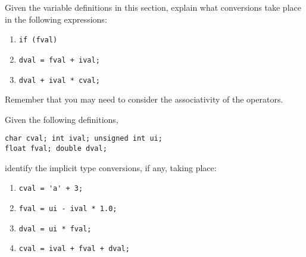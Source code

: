 %
%
\begin{question}
Given the variable definitions in this section, explain what
conversions take place in the following expressions:
\begin{enumerate}[label=(\alph*)]
^^I\item \verb|if (fval)|
^^I\item \verb|dval = fval + ival;|
^^I\item \verb|dval + ival * cval;|
\end{enumerate}
Remember that you may need to consider the associativity of the operators.
\end{question}

\begin{question}
Given the following definitions,
\begin{lstlisting}
char cval; int ival; unsigned int ui;
float fval; double dval;
\end{lstlisting}
identify the implicit type conversions, if any, taking place:
\begin{enumerate}[label=(\alph*)]
^^I\item \verb|cval = 'a' + 3;|
^^I\item \verb|fval = ui - ival * 1.0;|
^^I\item \verb|dval = ui * fval;|
^^I\item \verb|cval = ival + fval + dval;|
\end{enumerate}
\end{question}
